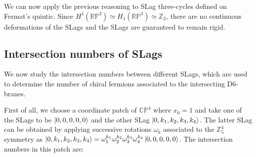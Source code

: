 We can now apply the previous reasoning to SLag three-cycles defined on Fermat's quintic.
Since $H^1(\mathbb{RP}^3)\simeq H_1(\mathbb{RP}^3)\simeq\mathbb Z_2$, there are no continuous deformations of the
SLags and the SLags are guaranteed to remain rigid.

\subsection{Intersection numbers of SLags}
We now study the intersection numbers between different SLags, which are used to determine the number 
of chiral fermions associated to the intersecting D6-branes.

First of all, we choose a coordinate patch of $\mathbb{CP}^4$ where $x_0=1$ and take one of the SLags to be $\ket{0,0,0,0,0}$
and the other SLag $\ket{0,k_1,k_2,k_3,k_4}$.
The latter SLag can  be  obtained by applying successive rotations $\omega_k$ associated to the $\mathbb Z_5^4$ symmetry
as $\ket{0,k_1,k_2,k_3,k_4}=\omega^{k_1}_1\omega^{k_2}_2\omega^{k_3}_3\omega^{k_4}_4\ket{0,0,0,0,0}$.
The intersection numbers in this patch are:
